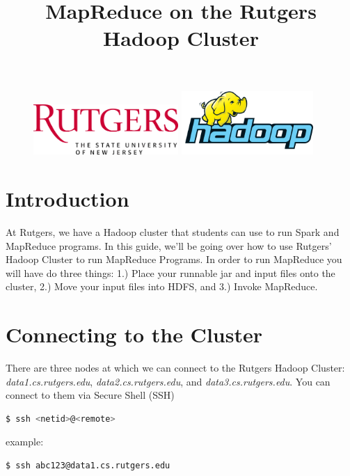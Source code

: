 \documentclass{article}
\title{MapReduce on the Rutgers Hadoop Cluster} %
\date{\vspace{-7ex}}
\begin{document}
\maketitle %


\begin{figure}[h!]
 \centering
 \includegraphics[width=55mm]{images/Rutgers}\hspace{15mm}
 \includegraphics[width=50mm]{images/hadoop}
\end{figure} 


\section*{Introduction} %

At Rutgers, we have a Hadoop cluster that students can use to run Spark and MapReduce programs. In this guide, we'll be going over how to use Rutgers' Hadoop Cluster to run MapReduce Programs. In order to run MapReduce you will have do three things: 1.) Place your runnable jar and input files onto the cluster, 2.) Move your input files into HDFS, and 3.) Invoke MapReduce. 



\hypersetup{hidelinks}
\tableofcontents



\section{Connecting to the Cluster}
There are three nodes at which we can connect to the Rutgers Hadoop Cluster: \textit{data1.cs.rutgers.edu}, \textit{data2.cs.rutgers.edu}, and \textit{data3.cs.rutgers.edu}. You can connect to them via Secure Shell (SSH)
\begin{lstlisting}[language=bash]
  $ ssh <netid>@<remote>
\end{lstlisting}
example:
\begin{lstlisting}[language=bash]
  $ ssh abc123@data1.cs.rutgers.edu
\end{lstlisting}
\end{document}
